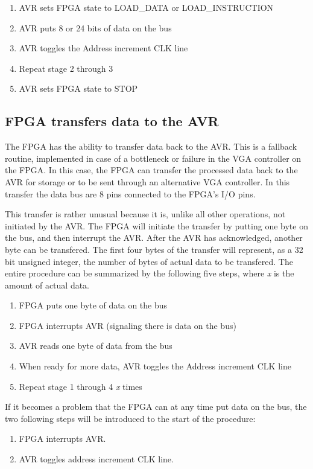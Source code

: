 \begin{enumerate}
\item AVR sets FPGA state to LOAD\_DATA or LOAD\_INSTRUCTION
\item AVR puts 8 or 24 bits of data on the bus
\item AVR toggles the Address increment CLK line
\item Repeat stage 2 through 3
\item AVR sets FPGA state to STOP
\end{enumerate}

\subsection{FPGA transfers data to the AVR}
The FPGA has the ability to transfer data back to the AVR. This is a fallback routine, implemented in case of a bottleneck or failure in the VGA controller on the FPGA. In this case, the FPGA can transfer the processed data back to the AVR for storage or to be sent through an alternative VGA controller. In this transfer the data bus are 8 pins connected to the FPGA's I/O pins.

This transfer is rather unusual because it is, unlike all other operations, not initiated by the AVR. The FPGA will initiate the transfer by putting one byte on the bus, and then interrupt the AVR. After the AVR has acknowledged, another byte can be transfered. The first four bytes of the transfer will represent, as a 32 bit unsigned integer, the number of bytes of actual data to be transfered. The entire procedure can be summarized by the following five steps, where \emph{x} is the amount of actual data.

\begin{enumerate}
\item FPGA puts one byte of data on the bus
\item FPGA interrupts AVR (signaling there is data on the bus)
\item AVR reads one byte of data from the bus
\item When ready for more data, AVR toggles the Address increment CLK line
\item Repeat stage 1 through 4 \emph{x} times
\end{enumerate}

If it becomes a problem that the FPGA can at any time put data on the bus, the two following steps will be introduced to the start of the procedure: 

\begin{enumerate}
\item FPGA interrupts AVR. 
\item AVR toggles address increment CLK line. 
\end{enumerate}


